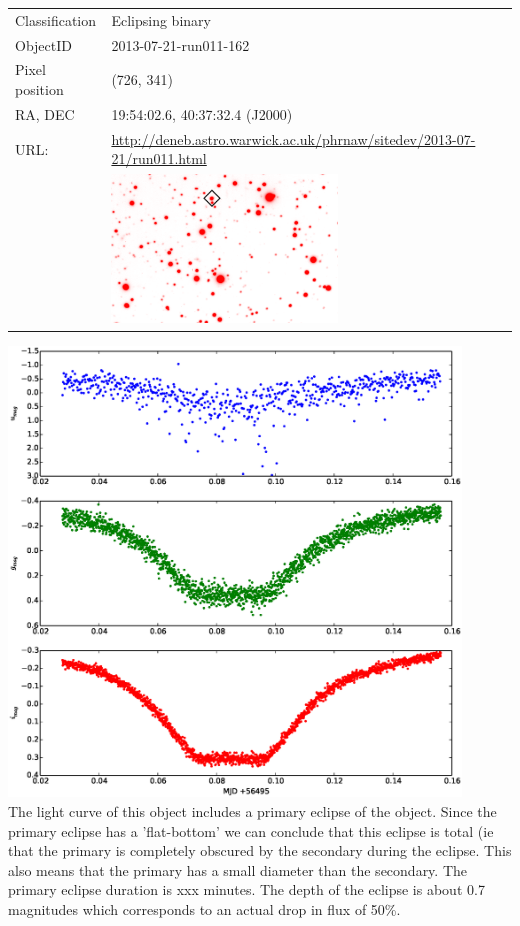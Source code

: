   \newpage
  \begin{tabular}{l l}
  Classification & Eclipsing binary \\
  ObjectID & 2013-07-21-run011-162 \\
  Pixel position & (726, 341) \\
  RA, DEC & 19:54:02.6, 40:37:32.4 (J2000) \\
  URL: & \small \url{http://deneb.astro.warwick.ac.uk/phrnaw/sitedev/2013-07-21/run011.html} \\
       & \includegraphics[width=60mm]{images/2013-07-21-run011-162.png} \\
  \end{tabular}
  \includegraphics[width=120mm]{images/2013-07-21-run011-162_lightcurve.eps} \\
  The light curve of this object includes a primary eclipse of the object. Since the primary eclipse has a 'flat-bottom' we can conclude that this eclipse is total (ie that the primary is completely obscured by the secondary during the eclipse. This also means that the primary has a small diameter than the secondary. The primary eclipse duration is xxx minutes. The depth of the eclipse is about 0.7 magnitudes which corresponds to an actual drop in flux of 50\%. 

